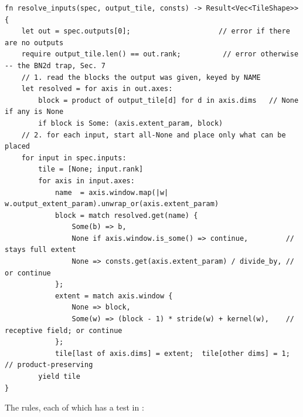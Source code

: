 \begin{lstlisting}
fn resolve_inputs(spec, output_tile, consts) -> Result<Vec<TileShape>> {
    let out = spec.outputs[0];                     // error if there are no outputs
    require output_tile.len() == out.rank;          // error otherwise -- the BN2d trap, Sec. 7
    // 1. read the blocks the output was given, keyed by NAME
    let resolved = for axis in out.axes:
        block = product of output_tile[d] for d in axis.dims   // None if any is None
        if block is Some: (axis.extent_param, block)
    // 2. for each input, start all-None and place only what can be placed
    for input in spec.inputs:
        tile = [None; input.rank]
        for axis in input.axes:
            name  = axis.window.map(|w| w.output_extent_param).unwrap_or(axis.extent_param)
            block = match resolved.get(name) {
                Some(b) => b,
                None if axis.window.is_some() => continue,         // stays full extent
                None => consts.get(axis.extent_param) / divide_by, // or continue
            };
            extent = match axis.window {
                None => block,
                Some(w) => (block - 1) * stride(w) + kernel(w),    // receptive field; or continue
            };
            tile[last of axis.dims] = extent;  tile[other dims] = 1;  // product-preserving
        yield tile
}
\end{lstlisting}

The rules, each of which has a test in :

